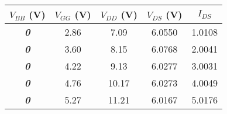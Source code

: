 \begin{tabular}{@{}ccccc@{}}
\toprule
\textbf{$V_{BB}$ (V)} & \multicolumn{1}{l}{\textbf{$V_{GG}$ (V)}} & \textbf{$V_{DD}$ (V)} & \textbf{$V_{DS}$ (V)} & \textbf{$I_{DS}$} \\ \midrule
\textit{\textbf{0}}     &  2.86     &   7.09    &  6.0550     & 1.0108      \\
\textit{\textbf{0}}     &  3.60     &   8.15    &  6.0768       &  2.0041     \\
\textit{\textbf{0}}     &  4.22     &   9.13    &  6.0277     & 3.0031      \\
\textit{\textbf{0}}     &  4.76     &   10.17    & 6.0273      & 4.0049      \\
\textit{\textbf{0}}     &  5.27     &   11.21    & 6.0167       &   5.0176    \\ \bottomrule
\end{tabular}